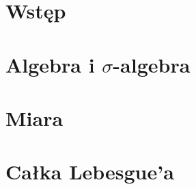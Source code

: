 \section{Wstęp}


\newpage
\section{Algebra i \texorpdfstring{\(\sigma\)}{sigma}-algebra}


\newpage
\section{Miara}


\newpage
\section{Całka Lebesgue'a}

